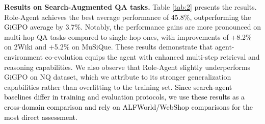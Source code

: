 \documentclass[11pt]{article}
\begin{document}
\begin{table}[t]
\vspace{-0.2cm}
\begin{center} 
\renewcommand{\arraystretch}{1}   
\setlength\tabcolsep{3pt} 
\end{center}
\vspace{-0.4cm}
\caption{\textcolor{black}{Ablation study of components with Qwen2.5-1.5B-Instruct.} We report the average success rate.}\label{tab:abl} 
\vspace{-0.5cm}
\end{table}
 
\noindent\textbf{Results on Search-Augmented QA tasks.}
Table \ref{tab:2} presents the results. Role-Agent achieves the best average performance of 45.8\%, \textcolor{black}{outperforming the GiGPO average by 3.7\%.} Notably, the performance gains are more pronounced on multi-hop QA tasks compared to single-hop ones, with improvements of +8.2\% on 2Wiki and +5.2\% on MuSiQue. These results demonstrate that agent-environment co-evolution equips the agent with enhanced multi-step retrieval and reasoning capabilities. We also observe that Role-Agent slightly underperforms GiGPO on NQ dataset, which we attribute to its stronger generalization capabilities rather than overfitting to the training set.
\textcolor{black}{Since search-agent baselines differ in training and evaluation protocols, we use these results as a cross-domain comparison and rely on ALFWorld/WebShop comparisons for the most direct assessment.}
\end{document}
